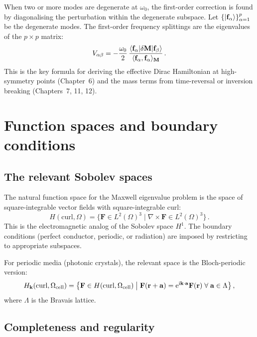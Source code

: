 When two or more modes are degenerate at $\omega_0$, the first-order
correction is found by diagonalising the perturbation within the
degenerate subspace.  Let $\{|\mathbf{f}_\alpha\rangle\}_{\alpha=1}^p$
be the degenerate modes.  The first-order frequency splittings are the
eigenvalues of the $p\times p$ matrix:
\begin{equation}\label{eq:appA-degenerate}
  V_{\alpha\beta}
  = -\frac{\omega_0}{2}\,
  \frac{\langle\mathbf{f}_\alpha|\delta\mathbf{M}|\mathbf{f}_\beta\rangle}
  {\langle \mathbf{f}_\alpha , \mathbf{f}_\alpha \rangle_{\mathbf{M}}}\,.
\end{equation}
This is the key formula for deriving the effective Dirac Hamiltonian
at high-symmetry points (Chapter~6) and the mass terms from
time-reversal or inversion breaking (Chapters~7, 11, 12).

\section{Function spaces and boundary conditions}
\label{sec:appA-function-spaces}

\subsection{The relevant Sobolev spaces} \cite{initio2026pdf}
\label{sec:appA-sobolev}

The natural function space for the Maxwell eigenvalue problem is the
space of square-integrable vector fields with square-integrable curl:
\begin{equation}\label{eq:appA-hcurl}
  H(\mathrm{curl},\Omega)
  = \bigl\{\mathbf{F}\in L^2(\Omega)^3
  \;\big|\;\nabla\times\mathbf{F}\in L^2(\Omega)^3\bigr\}\,.
\end{equation}
This is the electromagnetic analog of the Sobolev space $H^1$.  The
boundary conditions (perfect conductor, periodic, or radiation) are
imposed by restricting to appropriate subspaces.

For periodic media (photonic crystals), the relevant space is the
Bloch-periodic version:
\begin{equation}\label{eq:appA-bloch-space}
  H_{\mathbf{k}}(\mathrm{curl},\Omega_{\mathrm{cell}})
  = \bigl\{\mathbf{F}\in H(\mathrm{curl},\Omega_{\mathrm{cell}})
  \;\big|\;
  \mathbf{F}(\mathbf{r}+\mathbf{a})=\mathrm{e}^{\mathrm{i}\mathbf{k}\cdot\mathbf{a}}\mathbf{F}(\mathbf{r})
  \;\forall\;\mathbf{a}\in\Lambda\bigr\}\,,
\end{equation}
where $\Lambda$ is the Bravais lattice.

\subsection{Completeness and regularity}
\label{sec:appA-completeness}

